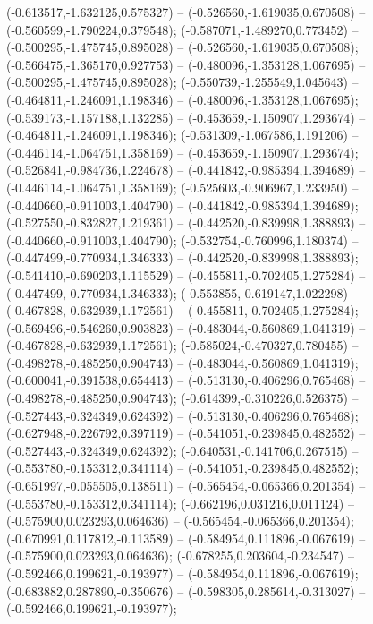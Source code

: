  (-0.613517,-1.632125,0.575327) -- (-0.526560,-1.619035,0.670508) -- (-0.560599,-1.790224,0.379548);
 (-0.587071,-1.489270,0.773452) -- (-0.500295,-1.475745,0.895028) -- (-0.526560,-1.619035,0.670508);
 (-0.566475,-1.365170,0.927753) -- (-0.480096,-1.353128,1.067695) -- (-0.500295,-1.475745,0.895028);
 (-0.550739,-1.255549,1.045643) -- (-0.464811,-1.246091,1.198346) -- (-0.480096,-1.353128,1.067695);
 (-0.539173,-1.157188,1.132285) -- (-0.453659,-1.150907,1.293674) -- (-0.464811,-1.246091,1.198346);
 (-0.531309,-1.067586,1.191206) -- (-0.446114,-1.064751,1.358169) -- (-0.453659,-1.150907,1.293674);
 (-0.526841,-0.984736,1.224678) -- (-0.441842,-0.985394,1.394689) -- (-0.446114,-1.064751,1.358169);
 (-0.525603,-0.906967,1.233950) -- (-0.440660,-0.911003,1.404790) -- (-0.441842,-0.985394,1.394689);
 (-0.527550,-0.832827,1.219361) -- (-0.442520,-0.839998,1.388893) -- (-0.440660,-0.911003,1.404790);
 (-0.532754,-0.760996,1.180374) -- (-0.447499,-0.770934,1.346333) -- (-0.442520,-0.839998,1.388893);
 (-0.541410,-0.690203,1.115529) -- (-0.455811,-0.702405,1.275284) -- (-0.447499,-0.770934,1.346333);
 (-0.553855,-0.619147,1.022298) -- (-0.467828,-0.632939,1.172561) -- (-0.455811,-0.702405,1.275284);
 (-0.569496,-0.546260,0.903823) -- (-0.483044,-0.560869,1.041319) -- (-0.467828,-0.632939,1.172561);
 (-0.585024,-0.470327,0.780455) -- (-0.498278,-0.485250,0.904743) -- (-0.483044,-0.560869,1.041319);
 (-0.600041,-0.391538,0.654413) -- (-0.513130,-0.406296,0.765468) -- (-0.498278,-0.485250,0.904743);
 (-0.614399,-0.310226,0.526375) -- (-0.527443,-0.324349,0.624392) -- (-0.513130,-0.406296,0.765468);
 (-0.627948,-0.226792,0.397119) -- (-0.541051,-0.239845,0.482552) -- (-0.527443,-0.324349,0.624392);
 (-0.640531,-0.141706,0.267515) -- (-0.553780,-0.153312,0.341114) -- (-0.541051,-0.239845,0.482552);
 (-0.651997,-0.055505,0.138511) -- (-0.565454,-0.065366,0.201354) -- (-0.553780,-0.153312,0.341114);
 (-0.662196,0.031216,0.011124) -- (-0.575900,0.023293,0.064636) -- (-0.565454,-0.065366,0.201354);
 (-0.670991,0.117812,-0.113589) -- (-0.584954,0.111896,-0.067619) -- (-0.575900,0.023293,0.064636);
 (-0.678255,0.203604,-0.234547) -- (-0.592466,0.199621,-0.193977) -- (-0.584954,0.111896,-0.067619);
 (-0.683882,0.287890,-0.350676) -- (-0.598305,0.285614,-0.313027) -- (-0.592466,0.199621,-0.193977);
